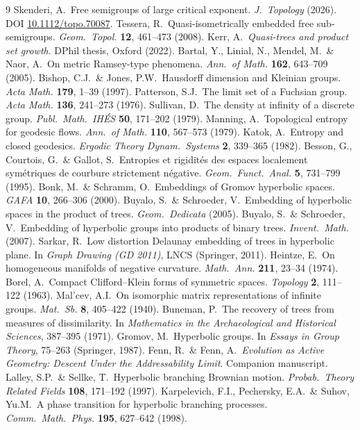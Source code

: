 \documentclass[11pt,reqno]{amsart}
\theoremstyle{plain}
\theoremstyle{definition}
\begin{document}
\begin{thebibliography}{9}\small
{} Skenderi, A.\ Free semigroups of large critical exponent. \emph{J.\ Topology} (2026). DOI \href{https://doi.org/10.1112/topo.70087}{10.1112/topo.70087}.
 Tessera, R.\ Quasi-isometrically embedded free sub-semigroups. \emph{Geom.\ Topol.} \textbf{12}, 461--473 (2008).
 Kerr, A.\ \emph{Quasi-trees and product set growth}. DPhil thesis, Oxford (2022).
 Bartal, Y., Linial, N., Mendel, M.\ \& Naor, A.\ On metric Ramsey-type phenomena. \emph{Ann.\ of Math.} \textbf{162}, 643--709 (2005).
 Bishop, C.J.\ \& Jones, P.W.\ Hausdorff dimension and Kleinian groups. \emph{Acta Math.} \textbf{179}, 1--39 (1997).
 Patterson, S.J.\ The limit set of a Fuchsian group. \emph{Acta Math.} \textbf{136}, 241--273 (1976).
 Sullivan, D.\ The density at infinity of a discrete group. \emph{Publ.\ Math.\ IH\'ES} \textbf{50}, 171--202 (1979).
 Manning, A.\ Topological entropy for geodesic flows. \emph{Ann.\ of Math.} \textbf{110}, 567--573 (1979).
 Katok, A.\ Entropy and closed geodesics. \emph{Ergodic Theory Dynam.\ Systems} \textbf{2}, 339--365 (1982).
 Besson, G., Courtois, G.\ \& Gallot, S.\ Entropies et rigidit\'es des espaces localement sym\'etriques de courbure strictement n\'egative. \emph{Geom.\ Funct.\ Anal.} \textbf{5}, 731--799 (1995).
 Bonk, M.\ \& Schramm, O.\ Embeddings of Gromov hyperbolic spaces. \emph{GAFA} \textbf{10}, 266--306 (2000).
 Buyalo, S.\ \& Schroeder, V.\ Embedding of hyperbolic spaces in the product of trees. \emph{Geom.\ Dedicata} (2005).
 Buyalo, S.\ \& Schroeder, V.\ Embedding of hyperbolic groups into products of binary trees. \emph{Invent.\ Math.} (2007).
 Sarkar, R.\ Low distortion Delaunay embedding of trees in hyperbolic plane. In \emph{Graph Drawing (GD 2011)}, LNCS (Springer, 2011).
 Heintze, E.\ On homogeneous manifolds of negative curvature. \emph{Math.\ Ann.} \textbf{211}, 23--34 (1974).
 Borel, A.\ Compact Clifford--Klein forms of symmetric spaces. \emph{Topology} \textbf{2}, 111--122 (1963).
 Mal'cev, A.I.\ On isomorphic matrix representations of infinite groups. \emph{Mat.\ Sb.} \textbf{8}, 405--422 (1940).
 Buneman, P.\ The recovery of trees from measures of dissimilarity. In \emph{Mathematics in the Archaeological and Historical Sciences}, 387--395 (1971).
 Gromov, M.\ Hyperbolic groups. In \emph{Essays in Group Theory}, 75--263 (Springer, 1987).
 Fenn, R.\ \& Fenn, A.\ \emph{Evolution as Active Geometry: Descent Under the Addressability Limit}. Companion manuscript.
 Lalley, S.P.\ \& Sellke, T.\ Hyperbolic branching Brownian motion. \emph{Probab.\ Theory Related Fields} \textbf{108}, 171--192 (1997).
 Karpelevich, F.I., Pechersky, E.A.\ \& Suhov, Yu.M.\ A phase transition for hyperbolic branching processes. \emph{Comm.\ Math.\ Phys.} \textbf{195}, 627--642 (1998).
\end{thebibliography}
\end{document}
